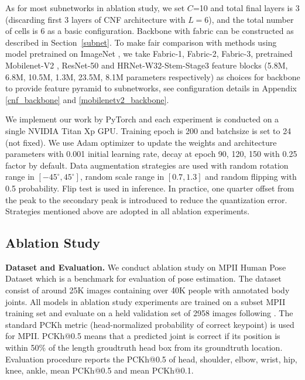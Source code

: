 \documentclass[journal]{IEEEtran}
\begin{document}
As for most subnetworks in ablation study, we set $C$=10 and total final layers is 3 (discarding first 3 layers of CNF architecture with $L=6$), and the total number of cells is 6 as a basic configuration. Backbone with fabric can be constructed as described in Section~\ref{subnet}. To make fair comparison with methods using model pretrained on ImageNet \cite{russakovsky2015imagenet}, we take Fabric-1, Fabric-2, Fabric-3, pretrained Mobilenet-V2 \cite{Sandler2018MobileNetV2IR}, ResNet-50 \cite{he2016deep} and HRNet-W32-Stem-Stage3 \cite{Sun_2019_CVPR} feature blocks (5.8M, 6.8M, 10.5M, 1.3M, 23.5M, 8.1M parameters respectively) as choices for backbone to provide feature pyramid to subnetworks, see configuration details in Appendix \ref{cnf_backbone} and \ref{mobilenetv2_backbone}. 



We implement our work by PyTorch \cite{paszke2017automatic} and each experiment is conducted on a single NVIDIA Titan Xp GPU. Training epoch is 200 and batchsize is set to 24 (not fixed). We use Adam \cite{kingma2014adam} optimizer to update the weights and architecture parameters with 0.001 initial learning rate, decay at epoch 90, 120, 150 with 0.25 factor by default. Data augmentation strategies are used with random rotation range in $\left[-45^{\circ}, 45^{\circ}\right]$, random scale range in $\left[0.7, 1.3\right]$ and random flipping with 0.5 probability. Flip test is used in inference. In practice, one quarter offset from the peak to the secondary peak is introduced to reduce the quantization error. Strategies mentioned above are adopted in all ablation experiments. 

\subsection{Ablation Study}


\label{ablation}




\textbf{Dataset and Evaluation.} We conduct ablation study on MPII Human Pose Dataset \cite{andriluka20142d} which is a benchmark for evaluation of pose estimation. The dataset consist of around 25K images containing over 40K people with annotated body joints. All models in ablation study experiments are trained on a subset MPII training set and evaluate on a held validation set of 2958 images following \cite{xiao2018simple}. The standard PCKh metric (head-normalized probability of correct keypoint) is used for MPII. PCKh@0.5 means that a predicted joint is correct if its position is within 50$\%$ of the length groudtruth head box from its groundtruth location. Evaluation procedure reports the PCKh@0.5 of head, shoulder, elbow, wrist, hip, knee, ankle, mean PCKh@0.5 and mean PCKh@0.1.  
\end{document}
